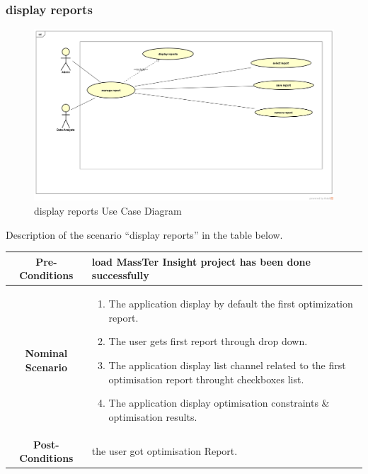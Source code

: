 	 \subsubsection{display reports}
	 	\begin{figure}[h]
	 	\centering
	 	\includegraphics[width=1.0\textwidth]{manageReport.png}
	 	\caption{display reports Use Case Diagram}
	 	
	 \end{figure}
  Description of the scenario ``display reports'' in the table below.
  
   \begin{table}
  	\centering
  	\begin{tabular}{|c|p{10cm}|}
  		\hline 	
  		\textbf{Pre-Conditions } & load MassTer Insight project has been done successfully  \\ 
  		\hline                     
  		\textbf{Nominal Scenario } &
  		\begin{enumerate}
  			\item The application display by default the first optimization report.
  			\item The user gets first report through drop down.
  			\item The application display list channel related to the first optimisation report throught checkboxes list.
  			\item The application display optimisation constraints \& optimisation results. 
 
  	   	\end{enumerate} \\ 
  		\hline 
  		\textbf{Post-Conditions} & the user got optimisation Report. \\
  		\hline 
  	\end{tabular}
  \end{table}


